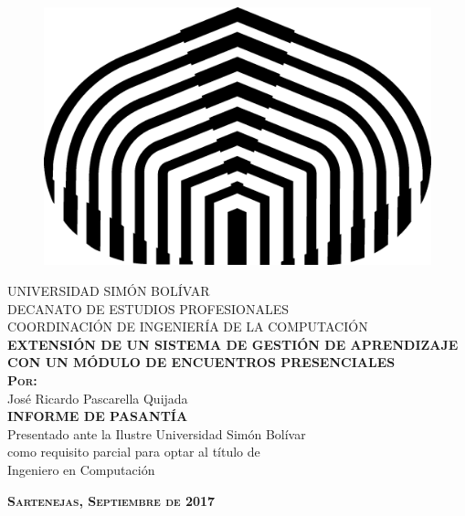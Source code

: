 \begin{titlepage}
\begin{center}

\begin{figure}[h]
\begin{center}
\includegraphics{logos/logoUSB.png}
\end{center}
\end{figure}

\textsc{UNIVERSIDAD SIMÓN BOLÍVAR}\\
\textsc{DECANATO DE ESTUDIOS PROFESIONALES}\\
\textsc{COORDINACIÓN DE INGENIERÍA DE LA COMPUTACIÓN}\\[8em]

\textsc{\Large \textbf{EXTENSIÓN DE UN SISTEMA DE GESTIÓN DE APRENDIZAJE CON UN MÓDULO DE ENCUENTROS PRESENCIALES}}\\[4em]

\textsc{ \textbf{Por:} }\\
José Ricardo Pascarella Quijada\\[4em]

\textsc{ \textbf{INFORME DE PASANTÍA} }\\
Presentado ante la Ilustre Universidad Simón Bolívar\\
como requisito parcial para optar al título de \\
Ingeniero en Computación

\vspace*{\fill}

\textsc{ \textbf{Sartenejas, Septiembre de 2017} }
\end{center}
\end{titlepage}